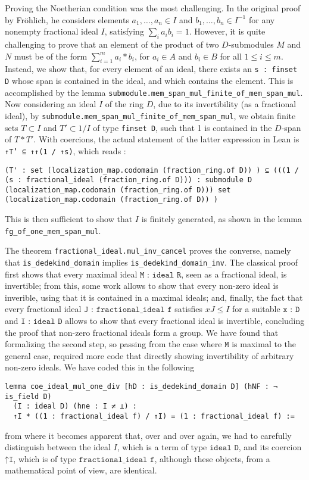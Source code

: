 \documentclass[a4paper,USenglish,cleveref, autoref, thm-restate]{lipics-v2021}
\newcommand{\lean}[1]{\texttt{#1}\xspace} %
\begin{document}
Proving the Noetherian condition was the most challenging. In the original proof by Fr\"ohlich, he considers elements $a_1, \dots, a_n \in I$ and $b_1, \dots, b_n \in I^{-1}$ for any nonempty fractional ideal $I$,
satisfying $ \sum_i a_i b_i = 1 $.
However, it is quite challenging to prove that an element of the product of two $D$-submodules $M$ and $N$ must be of the form $\sum_{i = 1}^m a_i*b_i$, for $a_i \in A$ and $b_i \in B$ for all $1 \leq i \leq m$.
Instead, we show that, for every element of an ideal, there exists an \lean{s : finset D} whose span is contained in the ideal, and which contains the element.
This is accomplished by the lemma \lean{submodule.mem\_span\_mul\_finite\_of\_mem\_span\_mul}.
Now considering an ideal $I$ of the ring $D$, due to its invertibility (as a fractional ideal), by \lean{submodule.mem\_span\_mul\_finite\_of\_mem\_span\_mul}, we obtain finite sets $T \subset I$ and $T' \subset 1/I$ of type \lean{finset D}, such that 1 is contained in the $D$-span of $T*T'$. With coercions, the actual statement of the latter expression in Lean is \lean{↑T' ⊆ ↑↑(1 / ↑s)}, which reads :

\begin{lstlisting}
(T' : set (localization_map.codomain (fraction_ring.of D)) ) ⊆ (((1 / (s : fractional_ideal (fraction_ring.of D))) : submodule D (localization_map.codomain (fraction_ring.of D))) set (localization_map.codomain (fraction_ring.of D)) )
\end{lstlisting}

This is then sufficient to show that $I$ is finitely generated, as shown in the lemma \lean{fg\_of\_one\_mem\_span\_mul}.

The theorem \lean{fractional\_ideal.mul\_inv\_cancel} proves the converse, namely that \lean{is\_dedekind\_domain} implies \lean{is\_dedekind\_domain\_inv}. The classical proof first shows that every maximal ideal $\lean{M : ideal R}$, seen as a fractional ideal, is invertible; from this, some work allows to show that every non-zero ideal is inverible, using that it is contained in a maximal ideals; and, finally, the fact that every fractional ideal $\lean{J : fractional\_ideal f}$ satisfies $xJ\leq I$ for a suitable $\lean{x : D}$ and $\lean{I : ideal D}$ allows to show that every fractional ideal is invertible, concluding the proof that non-zero fractional ideals form a group. We have found that formalizing the second step, so passing from the case where $\lean{M}$ is maximal to the general case, required more code that directly showing invertibility of arbitrary non-zero ideals. We have coded this in the following
\begin{lstlisting}
lemma coe_ideal_mul_one_div [hD : is_dedekind_domain D] (hNF : ¬ is_field D)
  (I : ideal D) (hne : I ≠ ⊥) :
  ↑I * ((1 : fractional_ideal f) / ↑I) = (1 : fractional_ideal f) :=
\end{lstlisting}
from where it becomes apparent that, over and over again, we had to carefully distinguish between the ideal $I$, which is a term of type $\lean{ideal D}$, and its coercion $\lean{↑I}$, which is of type $\lean{fractional\_ideal f}$, although these objects, from a mathematical point of view, are identical.
\end{document}
